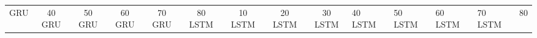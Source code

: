 \begin{table}
\begin{tabular}{|l|c|c|c|c|c|c|c|c|}
GRU & 40%
GRU & 50%
GRU & 60%
GRU & 70%
GRU & 80%
LSTM & 10%
LSTM & 20%
LSTM & 30%
LSTM & 40%
LSTM & 50%
LSTM & 60%
LSTM & 70%
LSTM & 80%

\end{tabular}
\end{table}
